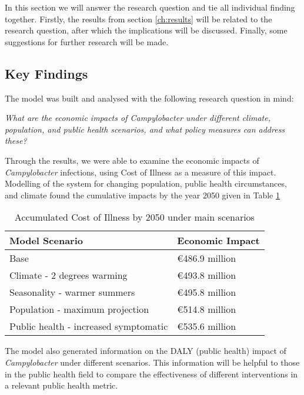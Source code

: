 In this section we will answer the research question and tie all individual finding together. Firstly, the results from section \ref{ch:results} will be related to the research question, after which the implications will be discussed. Finally, some suggestions for further research will be made. 

\subsection{Key Findings}

The model was built and analysed with the following research question in mind: 

\begin{center}\textit{\textcolor{NiceBlue}{
What are the economic impacts of Campylobacter under different climate, population, and public health scenarios, and what policy measures can address these? }}
\end{center}



Through the results, we were able to examine the economic impacts of \textit{Campylobacter} infections, using Cost of Illness as a measure of this impact. Modelling of the system for changing population, public health circumstances, and climate found the cumulative impacts by the year 2050 given in Table \ref{tab:coi_conclusion}

\begin{table}[h!]
\caption{Accumulated Cost of Illness by 2050 under main scenarios}
\label{tab:coi_conclusion}
\centering
\begin{tabular}{ll}
\hline
Model Scenario                        & Economic Impact  \\ \hline
Base                                  & €486.9 million           \\
Climate - 2 degrees warming           & €493.8 million           \\
Seasonality - warmer summers          & €495.8 million           \\
Population - maximum projection       & €514.8 million 			\\
Public health - increased symptomatic & €535.6 million \\ \hline
\end{tabular}
\end{table}

The model also generated information on the DALY (public health) impact of \textit{Campylobacter} under different scenarios. This information will be helpful to those in the public health field to compare the effectiveness of different interventions in a relevant public health metric.

